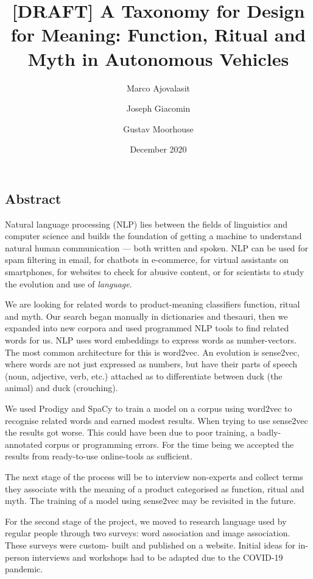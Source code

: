 \documentclass[12pt, usenames, dvipsnames]{report}
\title {[DRAFT] A Taxonomy for Design for Meaning: Function, Ritual and Myth in Autonomous Vehicles}
\date{December 2020}
\author[1]{Marco Ajovalasit}
\affil[1]{Department of Design, Politecnico di Milano}
\author[2]{Joseph Giacomin}
\affil[2]{Human Centred Design, Brunel University}
\author[3]{Gustav Moorhouse}
\affil[3]{Department of Design, Politecnico di Milano}
\begin{document}
\maketitle

\begin{flushleft}

\section*{Abstract}
Natural language processing (NLP) lies between the fields of linguistics and computer science and builds the foundation of getting a machine to understand natural human communication --- both written and spoken. 
NLP can be used for spam filtering in email, for chatbots in e-commerce, for virtual assistants on smartphones, for websites to check for abusive content, or for scientists to study the evolution and use of \emph{language}.

We are looking for related words to product-meaning classifiers function, ritual and myth.
Our search began manually in dictionaries and thesauri, then we expanded into new corpora and used programmed NLP tools to find related words for us.
NLP uses word embeddings to express words as number-vectors. 
The most common architecture for this is word2vec. 
An evolution is sense2vec, where words are not just expressed as numbers, but have their parts of speech (noun, adjective, verb, etc.) attached as to differentiate between duck (the animal) and duck (crouching). 

We used Prodigy and SpaCy to train a model on a corpus using word2vec to recognise related words and earned modest results.
When trying to use sense2vec the results got worse.
This could have been due to poor training, a badly-annotated corpus or programming errors.
For the time being we accepted the results from ready-to-use online-tools as sufficient.

The next stage of the process will be to interview non-experts and collect terms they associate with the meaning of a product categorised as function, ritual and myth.
The training of a model using sense2vec may be revisited in the future.

For the second stage of the project, we moved to research language used by regular people through two surveys: word association and image association.
These surveys were custom- built and published on a website.
Initial ideas for in-person interviews and workshops had to be adapted due to the COVID-19 pandemic.


\end{flushleft}
\end{document}

